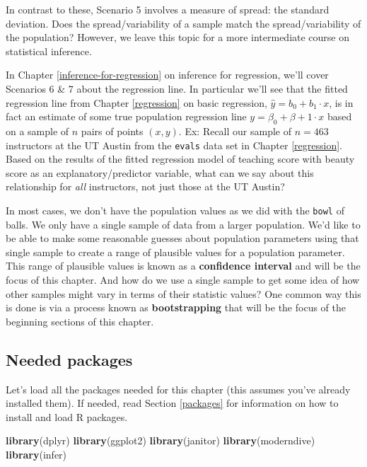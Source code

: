 \documentclass[12pt,]{krantz}
\makeatletter
\newenvironment{Shaded}{\begin{snugshade}}{\end{snugshade}}
\newcommand{\KeywordTok}[1]{\textcolor[rgb]{0.27,0.27,0.27}{\textbf{#1}}}
\newcommand{\NormalTok}[1]{#1}
\newenvironment{kframe}{%
\medskip{}
\setlength{\fboxsep}{.8em}
 \def\at@end@of@kframe{}%
 \ifinner\ifhmode%
  \def\at@end@of@kframe{\end{minipage}}%
  \begin{minipage}{\columnwidth}%
 \fi\fi%
 \def\FrameCommand##1{\hskip\@totalleftmargin \hskip-\fboxsep
 \colorbox{shadecolor}{##1}\hskip-\fboxsep
     \hskip-\linewidth \hskip-\@totalleftmargin \hskip\columnwidth}%
 \MakeFramed {\advance\hsize-\width
   \@totalleftmargin\z@ \linewidth\hsize
   \@setminipage}}%
 {\par\unskip\endMakeFramed%
 \at@end@of@kframe}
\renewenvironment{Shaded}{\begin{kframe}}{\end{kframe}}
\theoremstyle{definition}
\theoremstyle{definition}
\theoremstyle{definition}
\theoremstyle{remark}
\makeatother
\begin{document}
In contrast to these, Scenario 5 involves a measure of spread: the
standard deviation. Does the spread/variability of a sample match the
spread/variability of the population? However, we leave this topic for a
more intermediate course on statistical inference.

In Chapter \ref{inference-for-regression} on inference for regression,
we'll cover Scenarios 6 \& 7 about the regression line. In particular
we'll see that the fitted regression line from Chapter \ref{regression}
on basic regression, \(\widehat{y} = b_0 + b_1 \cdot x\), is in fact an
estimate of some true population regression line
\(y = \beta_0 + \beta+1 \cdot x\) based on a sample of \(n\) pairs of
points \((x, y)\). Ex: Recall our sample of \(n=463\) instructors at the
UT Austin from the \texttt{evals} data set in Chapter \ref{regression}.
Based on the results of the fitted regression model of teaching score
with beauty score as an explanatory/predictor variable, what can we say
about this relationship for \emph{all} instructors, not just those at
the UT Austin?

In most cases, we don't have the population values as we did with the
\texttt{bowl} of balls. We only have a single sample of data from a
larger population. We'd like to be able to make some reasonable guesses
about population parameters using that single sample to create a range
of plausible values for a population parameter. This range of plausible
values is known as a \textbf{confidence interval} and will be the focus
of this chapter. And how do we use a single sample to get some idea of
how other samples might vary in terms of their statistic values? One
common way this is done is via a process known as \textbf{bootstrapping}
that will be the focus of the beginning sections of this chapter.

\subsection*{Needed packages}\label{needed-packages-6}


Let's load all the packages needed for this chapter (this assumes you've
already installed them). If needed, read Section \ref{packages} for
information on how to install and load R packages.

\begin{Shaded}
\begin{Highlighting}[]
\KeywordTok{library}\NormalTok{(dplyr)}
\KeywordTok{library}\NormalTok{(ggplot2)}
\KeywordTok{library}\NormalTok{(janitor)}
\KeywordTok{library}\NormalTok{(moderndive)}
\KeywordTok{library}\NormalTok{(infer)}
\end{Highlighting}
\end{Shaded}
\end{document}
